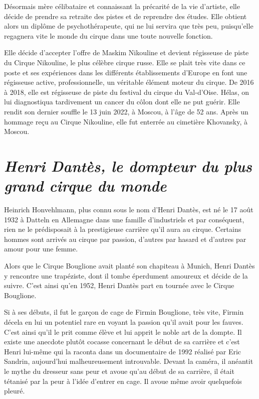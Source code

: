 Désormais mère célibataire et connaissant la précarité de la vie d’artiste, elle décide de prendre sa retraite des pistes et de reprendre des études. Elle obtient alors un diplôme de psychothérapeute, qui ne lui servira que très peu, puisqu'elle regagnera vite le monde du cirque dans une toute nouvelle fonction.	

Elle décide d’accepter l’offre de Maskim Nikouline et devient régisseuse de piste du Cirque Nikouline, le plus célèbre cirque russe. Elle se plait très vite dans ce poste et ses expériences dans les différents établissements d’Europe en font une régisseuse active, professionnelle, un véritable élément moteur du cirque. De 2016 à 2018, elle est régisseuse de piste du festival du cirque du Val-d'Oise. Hélas, on lui diagnostiqua tardivement un cancer du côlon dont elle ne put guérir. Elle rendit son dernier souffle le 13 juin 2022, à Moscou, à l'âge de 52 ans. Après un hommage reçu au Cirque Nikouline, elle fut enterrée au cimetière Khovansky, à Moscou.

\section*{\textit{Henri Dantès, le dompteur du plus grand cirque du monde }}
{}
Heinrich Honvehlmann, plus connu sous le nom d’Henri Dantès, est né le 17 août 1932 à Datteln en Allemagne dans une famille d’industriels et par conséquent, rien ne le prédisposait à la prestigieuse carrière qu’il aura au cirque. Certains hommes sont arrivés au cirque par passion, d’autres par hasard et d’autres par amour pour une femme.

Alors que le Cirque Bouglione avait planté son chapiteau à Munich, Henri Dantès y rencontre une trapéziste, dont il tombe éperdument amoureux et décide de la suivre. C’est ainsi qu’en 1952, Henri Dantès part en tournée avec le Cirque Bouglione.

Si à ses débuts, il fut le garçon de cage de Firmin Bouglione, très vite, Firmin décela en lui un potentiel rare en voyant la passion qu’il avait pour les fauves. C’est ainsi qu'il le prit comme élève et lui apprit le noble art de la dompte. Il existe une anecdote plutôt cocasse concernant le début de sa carrière et c’est Henri lui-même qui la raconta dans un documentaire de 1992 réalisé par Eric Sandrin, aujourd’hui malheureusement introuvable. Devant la caméra, il anéantit le mythe du dresseur sans peur et avoue qu’au début de sa carrière, il était tétanisé par la peur à l’idée d’entrer en cage. Il avoue même avoir quelquefois pleuré.

